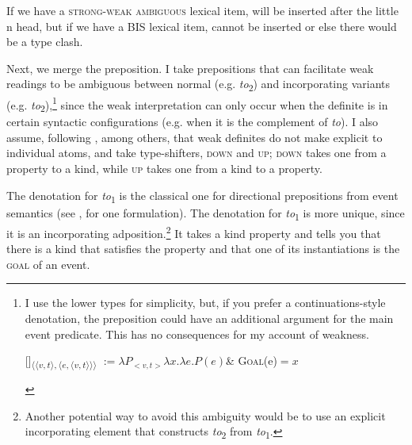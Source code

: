 \documentclass[output=paper,
modfonts
]{langscibook}
\begin{document}
If we have a \textsc{strong-weak ambiguous} lexical item,  will be inserted after the little n head, but if we have a BIS lexical item,  cannot be inserted or else there would be a type clash. 

Next, we merge the preposition. I take prepositions that can facilitate weak readings  to be ambiguous between normal (e.g. \textit{to}\textsubscript{2}) and incorporating variants (e.g. \textit{to}\textsubscript{2}),\footnote{I use the lower types for simplicity, but, if you prefer a continuations-style denotation, the preposition could have an additional argument for the main event predicate. This has no consequences for my account of weakness.
\begin{exe}
 \textnormal{[\!]\textsubscript{$\langle \langle v,t \rangle,\langle e,\langle v,t\rangle \rangle \rangle$} $:= \lambda P_{<v,t>} \lambda x. \lambda e.P(e) $\& \textsc{Goal}(e)$=x $}
\end{exe}\vspace*{-\baselineskip}} since the weak interpretation can only occur when the definite is in certain syntactic configurations (e.g. when it is the complement of \textit{to}). I also assume, following \citet{Aguilar-Guevara2014}, among others, that weak definites do not make explicit  to individual atoms, and take  type-shifters, \textsc{down} and \textsc{up}; \textsc{down} takes one from a property to a kind, while \textsc{up} takes one from a kind to a property. 

\begin{exe}
\end{exe}

The denotation for \textit{to}\textsubscript{1} is the classical one for directional prepositions from event semantics (see \citealt[57]{Champollion2017}, for one formulation). The denotation for \textit{to}\textsubscript{1} is more unique, since it is an incorporating adposition.\footnote{Another potential way to avoid this ambiguity would be to use an explicit incorporating element that constructs \textit{to}\textsubscript{2} from \textit{to}\textsubscript{1}.} It takes a kind property and tells you that there is a kind that satisfies the property and that one of its instantiations is the \textsc{goal} of an event.
\end{document}
